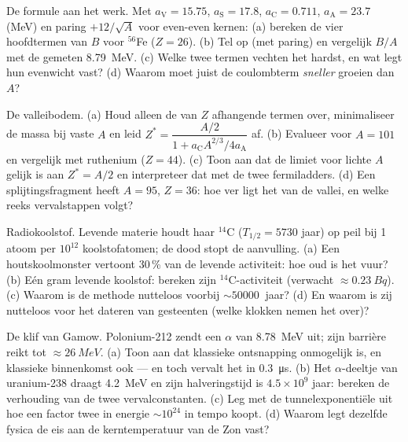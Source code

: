\begin{exercise}[$\star\star$]\label{exo:b3:nuclear-physics:5}
De formule aan het werk. Met $a_{\text{V}} = 15.75$,
$a_{\text{S}} = 17.8$, $a_{\text{C}} = 0.711$,
$a_{\text{A}} = 23.7$ (\unit{MeV}) en paring
$+12/\sqrt A$ voor even-even kernen: (a) bereken de vier hoofdtermen
van $B$ voor $^{56}$Fe ($Z = 26$). (b) Tel op (met paring) en
vergelijk $B/A$ met de gemeten \qty{8.79}{MeV}. (c) Welke twee
termen vechten het hardst, en wat legt hun evenwicht vast? (d) Waarom
moet juist de coulombterm \emph{sneller} groeien dan $A$?
\end{exercise}

\begin{exercise}[$\star\star$]\label{exo:b3:nuclear-physics:6}
De valleibodem. (a) Houd alleen de van $Z$ afhangende termen over,
minimaliseer de massa bij vaste $A$ en leid
$Z^* = \dfrac{A/2}{1 + a_{\text{C}}A^{2/3}/4a_{\text{A}}}$ af. (b)
Evalueer voor $A = 101$ en vergelijk met ruthenium ($Z = 44$).
(c) Toon aan dat de limiet voor lichte $A$ gelijk is aan $Z^* = A/2$ en interpreteer dat met
de twee fermiladders. (d) Een splijtingsfragment heeft $A = 95$,
$Z = 36$: hoe ver ligt het van de vallei, en welke reeks
vervalstappen volgt?
\end{exercise}

\begin{exercise}[$\star\star$]\label{exo:b3:nuclear-physics:7}
Radiokoolstof. Levende materie houdt haar $^{14}$C
($T_{1/2} = 5730$ jaar) op peil bij 1 atoom per $10^{12}$
koolstofatomen; de dood stopt de aanvulling. (a) Een houtskoolmonster vertoont
30\,\% van de levende activiteit: hoe oud is het vuur? (b) Eén gram
levende koolstof: bereken zijn $^{14}$C-activiteit
(verwacht $\approx\qty{0.23}{Bq}$). (c) Waarom is de methode nutteloos
voorbij $\sim\qty{50000}{}$ jaar? (d) En waarom is zij nutteloos voor het
dateren van gesteenten (welke klokken nemen het over)?
\end{exercise}

\begin{exercise}[$\star\star$]\label{exo:b3:nuclear-physics:8}
De klif van Gamow. Polonium-212 zendt een $\alpha$ van \qty{8.78}{MeV} uit;
zijn barrière reikt tot $\approx\qty{26}{MeV}$. (a) Toon aan dat klassieke
ontsnapping onmogelijk is, en klassieke binnenkomst ook --- en toch vervalt het
in \qty{0.3}{\micro s}. (b) Het $\alpha$-deeltje van uranium-238 draagt
\qty{4.2}{MeV} en zijn halveringstijd is $4.5\times10^9$ jaar:
bereken de verhouding van de twee vervalconstanten. (c) Leg met
de tunnelexponentiële uit hoe een factor twee in energie
$\sim10^{24}$ in tempo koopt. (d) Waarom legt dezelfde fysica de eis aan de
kerntemperatuur van de Zon vast?
\end{exercise}

